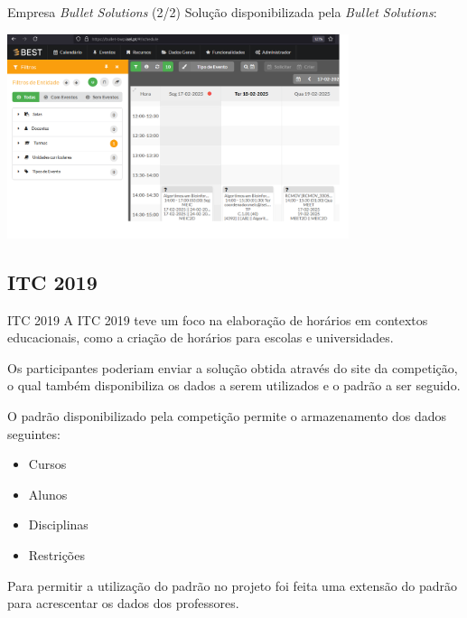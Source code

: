 \documentclass[aspectratio=169]{beamer}
\begin{document}
    \begin{frame}{Empresa \textit{Bullet Solutions} (2/2)}
        \justifying
        Solução disponibilizada pela \textit{Bullet Solutions}:
        \begin{center}
            \includegraphics[width=10cm]{img/exemplo-bullet-solutions-software.png}
        \end{center}
    \end{frame}
    
    \subsection{ITC 2019}

    \begin{frame}{ITC 2019}
        \justifying
        A ITC 2019 teve um foco na elaboração de horários em contextos educacionais, como a criação de horários para escolas e universidades.

        \vfill
        
        Os participantes poderiam enviar a solução obtida através do site da competição, o qual também disponibiliza os dados a serem utilizados e o padrão a ser seguido.

        \vfill
        
        O padrão disponibilizado pela competição permite o armazenamento dos dados seguintes:
        \begin{itemize}
            \item Cursos
            \item Alunos
            \item Disciplinas
            \item Restrições
        \end{itemize}

        \vfill

        Para permitir a utilização do padrão no projeto foi feita uma extensão do padrão para acrescentar os dados dos professores.
    \end{frame}
\end{document}
